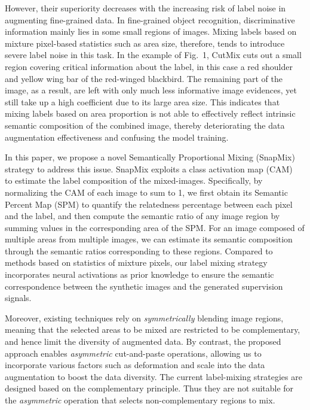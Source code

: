 \documentclass[letterpaper]{article} \usepackage{aaai21}  \usepackage{times}  \usepackage{helvet} \usepackage{courier}  \usepackage[hyphens]{url}  \usepackage{graphicx} \urlstyle{rm} \def\UrlFont{\rm}  \usepackage{natbib}  \usepackage{caption} \frenchspacing  \setlength{\pdfpagewidth}{8.5in}  \setlength{\pdfpageheight}{11in}
\begin{document}
However, their superiority decreases with the 
increasing risk of label noise in augmenting fine-grained data. 
In fine-grained object recognition, 
discriminative information mainly lies in some small regions of images. 
Mixing labels based on mixture pixel-based statistics such as
area size,
therefore, tends to introduce severe label noise in this task. 
In the example  of Fig.~1, CutMix
cuts out a small region covering critical information about the label,
in this case a red shoulder and yellow wing bar of the red-winged blackbird.
The remaining part of the image, as a result, are left with only
much less informative image evidences, yet still 
take up a high coefficient due to its large area size.
This indicates that 
mixing labels based on area proportion 
is not able to effectively
reflect intrinsic semantic composition
of the combined image, 
thereby  deteriorating the data augmentation effectiveness
and confusing the model training.


In this paper, we propose 
a novel Semantically Proportional Mixing (SnapMix) 
strategy to address this issue.
SnapMix exploits a class activation map (CAM)~\cite{zhou2016learning}  to estimate
the label composition of the mixed-images. 
Specifically, by normalizing the CAM of each image
to sum to 1, we first obtain its Semantic Percent Map (SPM) to quantify the relatedness percentage between each pixel and the label,
and then compute
the semantic ratio of any image region 
by summing values in the corresponding area of the SPM.
For an image composed of multiple areas from multiple images, 
we can estimate its semantic composition through the semantic ratios 
corresponding to these regions.  
Compared to methods based on  statistics of mixture pixels, 
our label mixing strategy incorporates neural activations as prior knowledge to 
ensure the semantic correspondence between the synthetic images 
and the generated supervision signals.

Moreover,  
existing techniques rely on
\emph{symmetrically} blending image regions, 
meaning that the selected areas to be mixed are restricted to be complementary,
and hence limit the
diversity of augmented data.
By contrast, the proposed approach enables
\emph{asymmetric}
cut-and-paste operations,
allowing us to incorporate various factors such as
deformation and scale
into the data augmentation
to boost the data diversity. The current label-mixing strategies are designed based on the complementary principle. Thus they are not suitable for the \emph{asymmetric} operation that selects non-complementary regions to mix.
\end{document}
